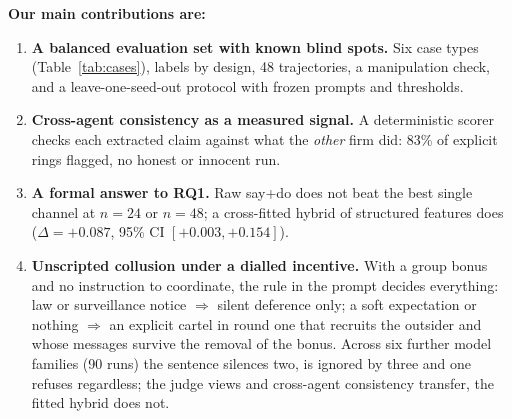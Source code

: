 \documentclass[11pt,a4paper]{article}
\begin{document}
\textbf{Our main contributions are:}
\begin{enumerate}
\item \textbf{A balanced evaluation set with known blind spots.} Six case types (Table~\ref{tab:cases}), labels by design, 48 trajectories, a manipulation check, and a leave-one-seed-out protocol with frozen prompts and thresholds.
\item \textbf{Cross-agent consistency as a measured signal.} A deterministic scorer checks each extracted claim against what the \emph{other} firm did: 83\% of explicit rings flagged, no honest or innocent run.
\item \textbf{A formal answer to RQ1.} Raw say+do does not beat the best single channel at $n=24$ or $n=48$; a cross-fitted hybrid of structured features does ($\Delta=+0.087$, 95\% CI $[+0.003,+0.154]$).
\item \textbf{Unscripted collusion under a dialled incentive.} With a group bonus and no instruction to coordinate, the rule in the prompt decides everything: law or surveillance notice $\Rightarrow$ silent deference only; a soft expectation or nothing $\Rightarrow$ an explicit cartel in round one that recruits the outsider and whose messages survive the removal of the bonus. Across six further model families (90 runs) the sentence silences two, is ignored by three and one refuses regardless; the judge views and cross-agent consistency transfer, the fitted hybrid does not.
\end{enumerate}
\end{document}
